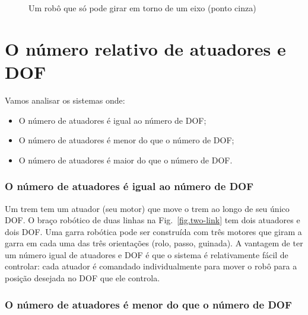 \begin{figure}
\begin{center}
\end{center}
\caption{Um robô que só pode girar em torno de um eixo (ponto cinza)}\label{fig.rot-dof}
\end{figure}

\section{O número relativo de atuadores e DOF}\label{s.num-actuators}

Vamos analisar os sistemas onde:
\begin{itemize}
\item O número de atuadores é igual ao número de DOF;
\item O número de atuadores é menor do que o número de DOF;
\item O número de atuadores é maior do que o número de DOF.
\end{itemize}

\subsubsection*{O número de atuadores é igual ao número de DOF}

Um trem tem um atuador (seu motor) que move o trem ao longo de seu único DOF. O braço robótico de duas linhas na Fig.~\ref{fig.two-link} tem dois atuadores e dois DOF. Uma garra robótica pode ser construída com três motores que giram a garra em cada uma das três orientações (rolo, passo, guinada). A vantagem de ter um número igual de atuadores e DOF é que o sistema é relativamente fácil de controlar: cada atuador é comandado individualmente para mover o robô para a posição desejada no DOF que ele controla.

\subsubsection*{O número de atuadores é menor do que o número de DOF}

